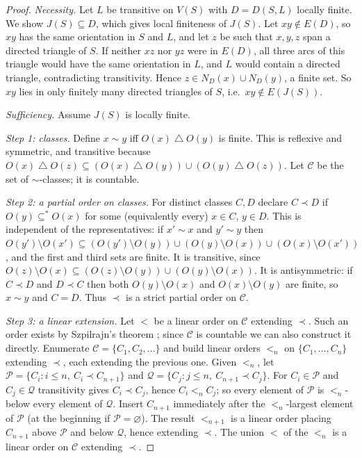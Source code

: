 \documentclass[11pt,a4paper]{article}
\theoremstyle{plain}
\theoremstyle{definition}
\theoremstyle{remark}
\newcommand{\fin}{\subseteq^{\ast}}
\newcommand{\symdiff}{\mathbin{\triangle}}
\begin{document}
\label{pf:criterion}
\lemcriterion*
\begin{proof}
\emph{Necessity.} Let $L$ be transitive on $V(S)$ with $D=D(S,L)$ locally finite. We show $J(S)\subseteq D$, which gives local finiteness of $J(S)$. Let $xy\notin E(D)$, so $xy$ has the same orientation in $S$ and $L$, and let $z$ be such that $x,y,z$ span a directed triangle of $S$. If neither $xz$ nor $yz$ were in $E(D)$, all three arcs of this triangle would have the same orientation in $L$, and $L$ would contain a directed triangle, contradicting transitivity. Hence $z\in N_D(x)\cup N_D(y)$, a finite set. So $xy$ lies in only finitely many directed triangles of $S$, i.e.\ $xy\notin E(J(S))$.

\emph{Sufficiency.} Assume $J(S)$ is locally finite.

\emph{Step 1: classes.} Define $x\sim y$ iff $O(x)\symdiff O(y)$ is finite. This is reflexive and symmetric, and transitive because $O(x)\symdiff O(z)\subseteq (O(x)\symdiff O(y))\cup(O(y)\symdiff O(z))$. Let $\mathcal C$ be the set of $\sim$-classes; it is countable.

\emph{Step 2: a partial order on classes.} For distinct classes $C,D$ declare $C\prec D$ if $O(y)\fin O(x)$ for some (equivalently every) $x\in C$, $y\in D$. This is independent of the representatives: if $x'\sim x$ and $y'\sim y$ then $O(y')\setminus O(x')\subseteq (O(y')\setminus O(y))\cup(O(y)\setminus O(x))\cup(O(x)\setminus O(x'))$, and the first and third sets are finite. It is transitive, since $O(z)\setminus O(x)\subseteq (O(z)\setminus O(y))\cup(O(y)\setminus O(x))$. It is antisymmetric: if $C\prec D$ and $D\prec C$ then both $O(y)\setminus O(x)$ and $O(x)\setminus O(y)$ are finite, so $x\sim y$ and $C=D$. Thus $\prec$ is a strict partial order on $\mathcal C$.

\emph{Step 3: a linear extension.} Let $<$ be a linear order on $\mathcal C$ extending $\prec$. Such an order exists by Szpilrajn's theorem \cite{Sz30}; since $\mathcal C$ is countable we can also construct it directly. Enumerate $\mathcal C=\{C_1,C_2,\dots\}$ and build linear orders $<_n$ on $\{C_1,\dots,C_n\}$ extending $\prec$, each extending the previous one. Given $<_n$, let $\mathcal P=\{C_i: i\le n,\ C_i\prec C_{n+1}\}$ and $\mathcal Q=\{C_j: j\le n,\ C_{n+1}\prec C_j\}$. For $C_i\in\mathcal P$ and $C_j\in\mathcal Q$ transitivity gives $C_i\prec C_j$, hence $C_i<_n C_j$; so every element of $\mathcal P$ is $<_n$-below every element of $\mathcal Q$. Insert $C_{n+1}$ immediately after the $<_n$-largest element of $\mathcal P$ (at the beginning if $\mathcal P=\varnothing$). The result $<_{n+1}$ is a linear order placing $C_{n+1}$ above $\mathcal P$ and below $\mathcal Q$, hence extending $\prec$. The union $<$ of the $<_n$ is a linear order on $\mathcal C$ extending $\prec$.


\end{proof}
\end{document}
